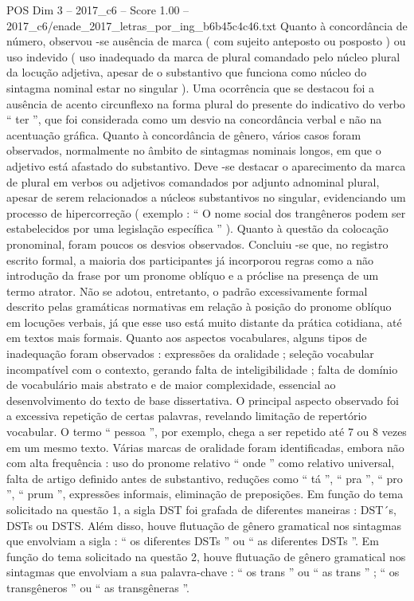 \begin{textsample}{POS Dim 3 – 2017\_c6 – Score 1.00 – 2017\_c6/enade\_2017\_letras\_por\_ing\_b6b45c4c46.txt}
Quanto à concordância de número, observou -se ausência de marca ( com sujeito anteposto ou posposto ) ou uso indevido ( uso inadequado da marca de plural comandado pelo núcleo plural da locução adjetiva, apesar de o substantivo que funciona como núcleo do sintagma nominal estar no singular ).
Uma ocorrência que se destacou foi a ausência de acento circunflexo na forma plural do presente do indicativo do verbo “ ter ”, que foi considerada como um desvio na concordância verbal e não na acentuação gráfica.
Quanto à concordância de gênero, vários casos foram observados, normalmente no âmbito de sintagmas nominais longos, em que o adjetivo está afastado do substantivo.
Deve -se destacar o aparecimento da marca de plural em verbos ou adjetivos comandados por adjunto adnominal plural, apesar de serem relacionados a núcleos substantivos no singular, evidenciando um processo de hipercorreção ( exemplo : “ O nome social dos trangêneros podem ser estabelecidos por uma legislação específica ” ).
Quanto à questão da colocação pronominal, foram poucos os desvios observados.
Concluiu -se que, no registro escrito formal, a maioria dos participantes já incorporou regras como a não introdução da frase por um pronome oblíquo e a próclise na presença de um termo atrator.
Não se adotou, entretanto, o padrão excessivamente formal descrito pelas gramáticas normativas em relação à posição do pronome oblíquo em locuções verbais, já que esse uso está muito distante da prática cotidiana, até em textos mais formais.
Quanto aos aspectos vocabulares, alguns tipos de inadequação foram observados : expressões da oralidade ; seleção vocabular incompatível com o contexto, gerando falta de inteligibilidade ; falta de domínio de vocabulário mais abstrato e de maior complexidade, essencial ao desenvolvimento do texto de base dissertativa.
O principal aspecto observado foi a excessiva repetição de certas palavras, revelando limitação de repertório vocabular.
O termo “ pessoa ”, por exemplo, chega a ser repetido até 7 ou 8 vezes em um mesmo texto.
Várias marcas de oralidade foram identificadas, embora não com alta frequência : uso do pronome relativo “ onde ” como relativo universal, falta de artigo definido antes de substantivo, reduções como “ tá ”, “ pra ”, “ pro ”, “ prum ”, expressões informais, eliminação de preposições.
Em função do tema solicitado na questão 1, a sigla DST foi grafada de diferentes maneiras : DST´s, DSTs ou DSTS.
Além disso, houve flutuação de gênero gramatical nos sintagmas que envolviam a sigla : “ os diferentes DSTs ” ou “ as diferentes DSTs ”.
Em função do tema solicitado na questão 2, houve flutuação de gênero gramatical nos sintagmas que envolviam a sua palavra-chave : “ os trans ” ou “ as trans ” ; “ os transgêneros ” ou “ as transgêneras ”.

\end{textsample}
